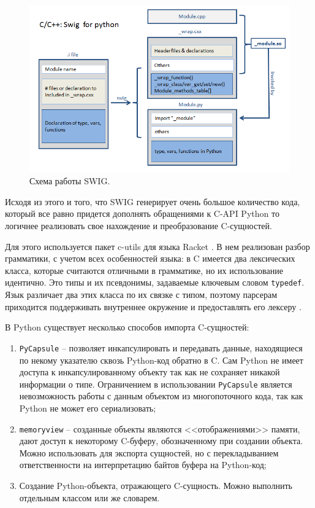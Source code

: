 \begin{figure}[!htbp]
    \centering
    \begin{adjustbox}{max totalsize={0.8\textwidth}{\textheight}}
        \includegraphics[]{images/swig.png}
    \end{adjustbox}
    \caption{Схема работы SWIG.}\label{fig:swig}
\end{figure}

Исходя из этого и того, что SWIG генерирует очень большое количество кода,
который все равно придется дополнять обращениями к C-API Python то логичнее
реализовать свое нахождение и преобразование C-сущностей.

Для этого используется пакет c-utils \cite{c-utils} для языка Racket \cite{racket}.
В нем реализован разбор грамматики, с учетом всех особенностей
языка: в C имеется два лексических класса, которые считаются
отличными в грамматике, но их использование идентично.
Это типы и их псевдонимы, задаваемые ключевым словом \texttt{typedef}.
Язык различает два этих класса по их связке с типом, поэтому
парсерам приходится поддерживать внутреннее окружение и предоставлять
его лексеру \cite{c-utils-internals}.

В Python существует несколько способов импорта C-сущностей:

\begin{enumerate}[label={\arabic*)}]
    \item \texttt{PyCapsule} -- позволяет инкапсулировать и передавать данные, находящиеся по некому указателю
          сквозь Python-код обратно в C. Сам Python не имеет доступа к инкапсулированному объекту
          так как не сохраняет никакой информации о типе. Ограничением в использовании \texttt{PyCapsule}
          является невозможность работы с данным объектом из многопоточного кода, так как
          Python не может его сериализовать;
    \item \texttt{memoryview} -- созданные объекты являются <<отображениями>> памяти, дают доступ
          к некоторому C-буферу, обозначенному при создании объекта. Можно использовать для
          экспорта сущностей, но с перекладыванием ответственности на интерпретацию байтов буфера
          на Python-код;
    \item Создание Python-объекта, отражающего C-сущность. Можно выполнить отдельным классом или
          же словарем.
\end{enumerate}

